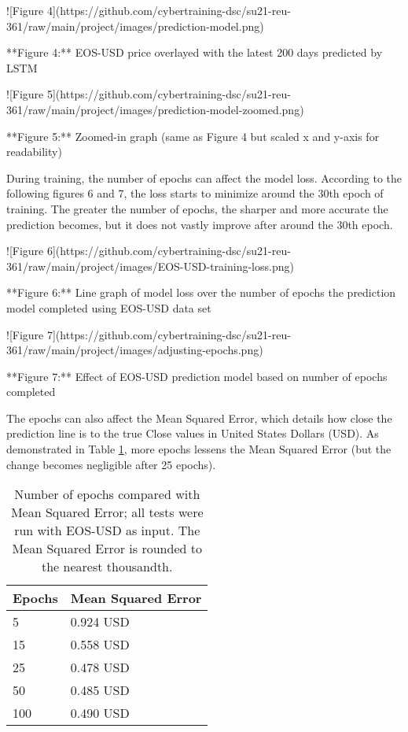 \documentclass[acmtog,authorversion]{acmart}
\begin{document}
![Figure 4](https://github.com/cybertraining-dsc/su21-reu-361/raw/main/project/images/prediction-model.png)

**Figure 4:** EOS-USD price overlayed with the latest 200 days predicted by LSTM

![Figure 5](https://github.com/cybertraining-dsc/su21-reu-361/raw/main/project/images/prediction-model-zoomed.png)

**Figure 5:** Zoomed-in graph (same as Figure 4 but scaled x and y-axis for readability)

During training, the number of epochs can affect the model loss. According to the following figures 6 and 7, the loss starts to minimize around the 30th epoch of training. The greater the number of epochs, the sharper and more accurate the prediction becomes, but it does not vastly improve after around the 30th epoch.

![Figure 6](https://github.com/cybertraining-dsc/su21-reu-361/raw/main/project/images/EOS-USD-training-loss.png)

**Figure 6:** Line graph of model loss over the number of epochs the prediction model completed using EOS-USD data set

![Figure 7](https://github.com/cybertraining-dsc/su21-reu-361/raw/main/project/images/adjusting-epochs.png)

**Figure 7:** Effect of EOS-USD prediction model based on number of epochs completed

The epochs can also affect the Mean Squared Error, which details how close the prediction line is to the true Close values in United States Dollars (USD). As demonstrated in Table \ref{tab:epochvsmse}, more epochs lessens the Mean Squared Error (but the change becomes negligible after 25 epochs).


\begin{table}[htb]
\caption{Number of epochs compared with Mean Squared Error; all tests were run with EOS-USD as input. The Mean Squared Error is rounded to the nearest thousandth.}
\label{tab:epochvsmse}
\begin{tabular}{ll}
Epochs &   Mean Squared Error   \\
\hline
 5      & 0.924 USD              \\
 15     & 0.558 USD              \\
 25     & 0.478 USD              \\
 50     & 0.485 USD              \\
 100    & 0.490 USD              \\
\hline
\end{tabular}
\end{table}
\end{document}
